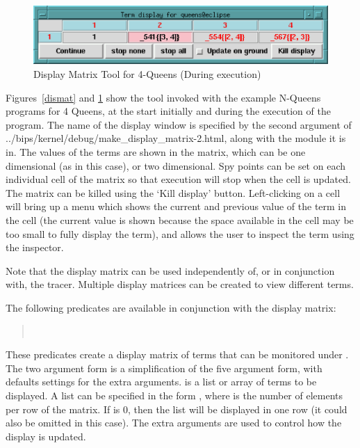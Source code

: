 \begin{figure}[bt]
\begin{center}
\includegraphics{dismat2.eps}
\end{center}
\caption{Display Matrix Tool for 4-Queens (During execution)}
\label{dismat2}
\end{figure}

Figures~\ref{dismat} and \ref{dismat2} show the tool
invoked with the example N-Queens programs for 4 Queens, at the start
initially and during the execution of the program. The name of the display
window is specified by the second argument of
%
{../bips/kernel/debug/make_display_matrix-2.html},
along with the module it is in. The values of the terms are shown in the
matrix, which can be one dimensional (as in this case), or two
dimensional. Spy points can be set on each individual cell of the matrix
so that execution will stop when the cell is updated. The matrix can be
killed using the `Kill display' button. Left-clicking on a cell will bring
up a menu which shows the current and previous value of the term in the
cell (the current value is shown because the space available in the cell
may be too small to fully display the term), and allows the user to inspect
the term using the inspector.

Note that the display matrix can be used independently of, or in conjunction
with, the tracer. Multiple display matrices can be created to view
different terms.

The following predicates are available in conjunction with the display
matrix:

\medskip
\begin{quote}
%
\\
%
\end{quote}

These
predicates create a display matrix of terms that can be monitored under
{\tkeclipse}. The two argument form is a simplification of the five argument
form, with defaults settings for the extra arguments.
 is a list or
array of terms to be displayed.
A list  can be specified in the form ,
where  is the number of elements per row of the matrix.
If  is 0, then
the list will be displayed in one row (it could also be omitted in this
case). The extra arguments are used to control how the display is updated.

